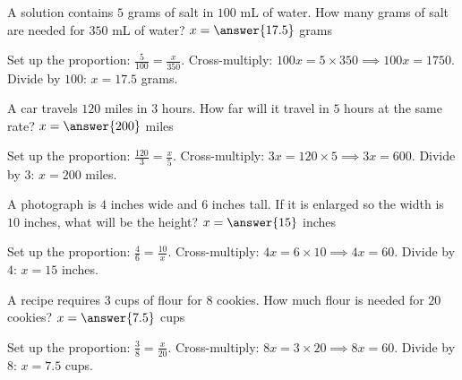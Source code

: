 \documentclass{ximera}
\begin{document}
\begin{problem}
A solution contains $5$ grams of salt in $100$ mL of water. How many grams of salt are needed for $350$ mL of water? $x=\answer{17.5}$ grams
\begin{feedback}
Set up the proportion: $\frac{5}{100} = \frac{x}{350}$. Cross-multiply: $100x = 5 \times 350 \implies 100x = 1750$. Divide by $100$: $x = 17.5$ grams.
\end{feedback}
\end{problem}

\begin{problem}
A car travels $120$ miles in $3$ hours. How far will it travel in $5$ hours at the same rate? $x=\answer{200}$ miles
\begin{feedback}
Set up the proportion: $\frac{120}{3} = \frac{x}{5}$. Cross-multiply: $3x = 120 \times 5 \implies 3x = 600$. Divide by $3$: $x = 200$ miles.
\end{feedback}
\end{problem}

\begin{problem}
A photograph is $4$ inches wide and $6$ inches tall. If it is enlarged so the width is $10$ inches, what will be the height? $x=\answer{15}$ inches
\begin{feedback}
Set up the proportion: $\frac{4}{6} = \frac{10}{x}$. Cross-multiply: $4x = 6 \times 10 \implies 4x = 60$. Divide by $4$: $x = 15$ inches.
\end{feedback}
\end{problem}

\begin{problem}
A recipe requires $3$ cups of flour for $8$ cookies. How much flour is needed for $20$ cookies? $x=\answer{7.5}$ cups
\begin{feedback}
Set up the proportion: $\frac{3}{8} = \frac{x}{20}$. Cross-multiply: $8x = 3 \times 20 \implies 8x = 60$. Divide by $8$: $x = 7.5$ cups.
\end{feedback}
\end{problem}

\end{document}
